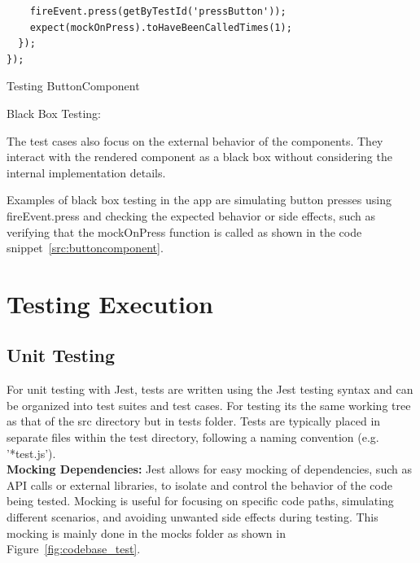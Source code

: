 \begin{compactenum}
\begin{compactitem}
\begin{listing}[H]
\begin{verbatim}
    fireEvent.press(getByTestId('pressButton'));
    expect(mockOnPress).toHaveBeenCalledTimes(1);
  });
});
\end{verbatim}
\caption{Testing ButtonComponent}
\label{src:buttoncomponent}
\end{listing}
    \end{compactitem}
    \item Black Box Testing:
    \begin{compactitem}
        \item The test cases also focus on the external behavior of the components. They interact with the rendered component as a black box without considering the internal implementation details.
        \item Examples of black box testing in the app are simulating button presses using fireEvent.press and checking the expected behavior or side effects, such as verifying that the mockOnPress function is called as shown in the code snippet~\ref{src:buttoncomponent}.
        
    \end{compactitem}
\end{compactenum}
\section{Testing Execution}\label{sec:testing-execution}
\subsection{Unit Testing}
For unit testing with Jest, tests are written using the Jest testing syntax and can be organized into test suites and test cases. For testing its the same working tree as that of the src directory but in tests folder. Tests are typically placed in separate files within the test directory, following a naming convention (e.g. '*test.js'). \\
\textbf{Mocking Dependencies:} Jest allows for easy mocking of dependencies, such as API calls or external libraries, to isolate and control the behavior of the code being tested. Mocking is useful for focusing on specific code paths, simulating different scenarios, and avoiding unwanted side effects during testing. This mocking is mainly done in the mocks folder as shown in Figure~\ref{fig:codebase_test}.

